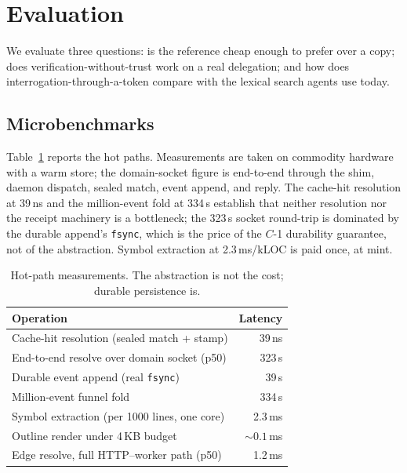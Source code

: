 \documentclass[10pt,twocolumn]{article}
\begin{document}
\section{Evaluation}
\label{sec:eval}

We evaluate three questions: is the reference cheap enough to prefer over
a copy; does verification-without-trust work on a real delegation; and how
does interrogation-through-a-token compare with the lexical search agents
use today.

\subsection{Microbenchmarks}
Table~\ref{tab:perf} reports the hot paths. Measurements are taken on
commodity hardware with a warm store; the domain-socket figure is
end-to-end through the shim, daemon dispatch, sealed match, event append,
and reply. The cache-hit resolution at 39\,ns and the million-event fold
at 334\,\textmu{}s establish that neither resolution nor the receipt
machinery is a bottleneck; the 323\,\textmu{}s socket round-trip is
dominated by the durable append's \texttt{fsync}, which is the price of the
$C\!$-1 durability guarantee, not of the abstraction. Symbol extraction at
2.3\,ms/kLOC is paid once, at mint.

\begin{table}[t]
\centering
\small
\caption{Hot-path measurements. The abstraction is not the cost; durable
persistence is.}
\label{tab:perf}
\renewcommand{\arraystretch}{1.15}
\begin{tabular}{@{}lr@{}}
\toprule
\textbf{Operation} & \textbf{Latency}\\
\midrule
Cache-hit resolution (sealed match + stamp) & 39\,ns\\
End-to-end resolve over domain socket (p50) & 323\,\textmu{}s\\
Durable event append (real \texttt{fsync}) & 39\,\textmu{}s\\
Million-event funnel fold & 334\,\textmu{}s\\
Symbol extraction (per 1000 lines, one core) & 2.3\,ms\\
Outline render under 4\,KB budget & ${\sim}0.1$\,ms\\
Edge resolve, full HTTP--worker path (p50) & 1.2\,ms\\
\bottomrule
\end{tabular}
\end{table}
\end{document}
